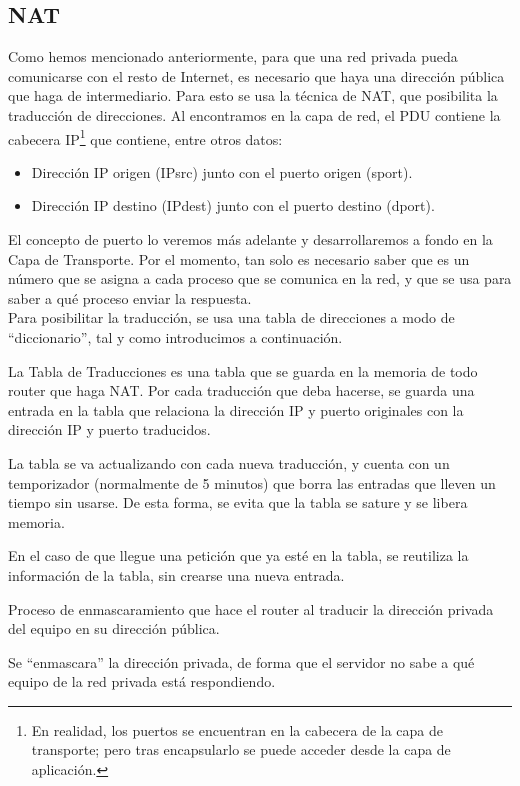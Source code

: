 \subsection{\acrfull{NAT}}

Como hemos mencionado anteriormente, para que una red privada pueda comunicarse con el resto de Internet, es necesario que haya una dirección pública que haga de intermediario. Para esto se usa la técnica de \acrshort{NAT}, que posibilita la traducción de direcciones.
Al encontramos en la capa de red, el \acrshort{PDU} contiene la cabecera IP\footnote{En realidad, los puertos se encuentran en la cabecera de la capa de transporte; pero tras encapsularlo se puede acceder desde la capa de aplicación.} que contiene, entre otros datos:
\begin{itemize}
    \item Dirección IP origen ({IPsrc}) junto con el puerto origen ({sport}).
    \item Dirección IP destino ({IPdest}) junto con el puerto destino ({dport}).
\end{itemize}

El concepto de puerto lo veremos más adelante y desarrollaremos a fondo en la Capa de Transporte. Por el momento, tan solo es necesario saber que es un número que se asigna a cada proceso que se comunica en la red, y que se usa para saber a qué proceso enviar la respuesta.\\

Para posibilitar la traducción, se usa una tabla de direcciones a modo de ``diccionario'', tal y como introducimos a continuación.
\begin{definicion}
    La Tabla de Traducciones es una tabla que se guarda en la memoria de todo router que haga \acrshort{NAT}.
    Por cada traducción que deba hacerse, se guarda una entrada en la tabla que relaciona la dirección IP y puerto originales con la dirección IP y puerto traducidos.

    La tabla se va actualizando con cada nueva traducción, y cuenta con un temporizador (normalmente de 5 minutos) que borra las entradas que lleven un tiempo sin usarse. De esta forma, se evita que la tabla se sature y se libera memoria.

    En el caso de que llegue una petición que ya esté en la tabla, se reutiliza la información de la tabla, sin crearse una nueva entrada.
\end{definicion}

\begin{definicion}
    Proceso de enmascaramiento que hace el router al traducir la dirección privada del equipo en su dirección pública.

    Se ``enmascara'' la dirección privada, de forma que el servidor no sabe a qué equipo de la red privada está respondiendo.
\end{definicion}

